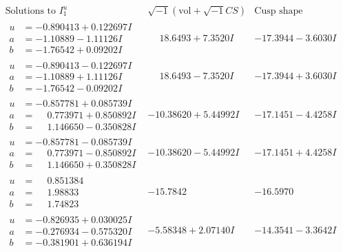 \documentclass[1p]{elsarticle_modified}
\theoremstyle{definition}
\newcommand{\I}{\sqrt{-1}}
\begin{document}
$$\begin{array}{c|c|c}  
\text{Solutions to }I^u_{1}& \I (\text{vol} + \sqrt{-1}CS) & \text{Cusp shape}\\
 \hline 
\begin{aligned}
u &= -0.890413 + 0.122697 I \\
a &= -1.10889 - 1.11126 I \\
b &= -1.76542 + 0.09202 I\end{aligned}
 & \phantom{-}18.6493 + 7.3520 I & -17.3944 - 3.6030 I \\ \hline\begin{aligned}
u &= -0.890413 - 0.122697 I \\
a &= -1.10889 + 1.11126 I \\
b &= -1.76542 - 0.09202 I\end{aligned}
 & \phantom{-}18.6493 - 7.3520 I & -17.3944 + 3.6030 I \\ \hline\begin{aligned}
u &= -0.857781 + 0.085739 I \\
a &= \phantom{-}0.773971 + 0.850892 I \\
b &= \phantom{-}1.146650 - 0.350828 I\end{aligned}
 & -10.38620 + 5.44992 I & -17.1451 - 4.4258 I \\ \hline\begin{aligned}
u &= -0.857781 - 0.085739 I \\
a &= \phantom{-}0.773971 - 0.850892 I \\
b &= \phantom{-}1.146650 + 0.350828 I\end{aligned}
 & -10.38620 - 5.44992 I & -17.1451 + 4.4258 I \\ \hline\begin{aligned}
u &= \phantom{-}0.851384\phantom{ +0.000000I} \\
a &= \phantom{-}1.98833\phantom{ +0.000000I} \\
b &= \phantom{-}1.74823\phantom{ +0.000000I}\end{aligned}
 & -15.7842\phantom{ +0.000000I} & -16.5970\phantom{ +0.000000I} \\ \hline\begin{aligned}
u &= -0.826935 + 0.030025 I \\
a &= -0.276934 - 0.575320 I \\
b &= -0.381901 + 0.636194 I\end{aligned}
 & -5.58348 + 2.07140 I & -14.3541 - 3.3642 I \\ \hline\begin{aligned}

\end{aligned}
\end{array}$$
\end{document}
